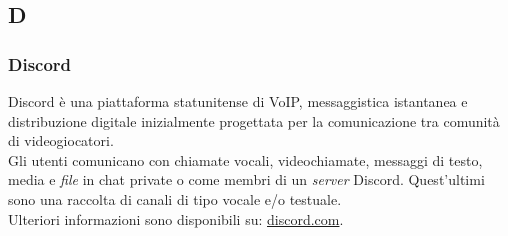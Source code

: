 \subsection{D}
\subsubsection{Discord}
Discord è una piattaforma statunitense di VoIP, messaggistica istantanea e distribuzione digitale inizialmente progettata per la comunicazione tra comunità di videogiocatori.\\
Gli utenti comunicano con chiamate vocali, videochiamate, messaggi di testo, media e \textit{file} in chat private o come membri di un \textit{server} Discord. Quest'ultimi sono una raccolta di canali di tipo vocale e/o testuale.\\
Ulteriori informazioni sono disponibili su: \href{https://discord.com/}{discord.com}.